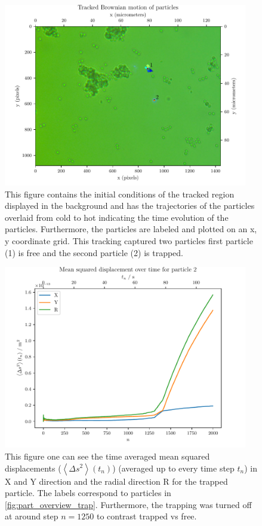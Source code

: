 \documentclass[12pt,english,ngerman]{scrartcl}
\begin{document}
\begin{figure}[H]
	\centering
	\includegraphics[width=0.95\textwidth]{figures/III_tracked.pdf}
	\caption[Capture of trapped particle]{This figure contains the initial conditions of the
		tracked region displayed in the background and has the trajectories of the
		particles overlaid from cold to hot indicating the time evolution of the
		particles. Furthermore, the particles are labeled and plotted on an x, y
		coordinate grid. This tracking captured two particles first particle (1) is
		free and the second particle (2) is trapped.
	}\label{fig:part_overview_trap}
\end{figure}

\begin{figure}[H]
	\centering
	\includegraphics[width=0.95\textwidth]{figures/III_particle_trapped.pdf}
	\caption[Time averaged mean squared displacements of trapped particle]{This figure one
		can see the time averaged mean squared displacements ($\left\langle \Delta s^2
			\right\rangle(t_n)$) (averaged up to every time step $t_n$) in X and Y
		direction and the radial direction R for the trapped particle. The labels
		correspond to particles in \autoref{fig:part_overview_trap}. Furthermore, the
		trapping was turned off at around step $n=1250$ to contrast trapped vs free.
	}\label{fig:part_trapped}
\end{figure}
\end{document}
